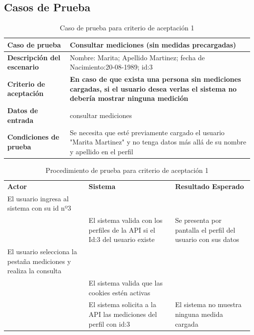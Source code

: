 \subsection{Casos de Prueba}


	{\scriptsize
	\begin{table}[h]
	\centering
	\begin{tabular}{||l|p{10cm}||}
    	\rowcolor[gray]{0.9}
	    \hline 
        \hline 
	    \textbf{Caso de prueba} & \textbf{Consultar mediciones (sin medidas precargadas)}\\  \hline
	    \textbf{Descripción del escenario}& Nombre: Marita; Apellido Martinez; fecha de Nacimiento:20-08-1989; id:3  \\ \hline
	    \textbf{Criterio de aceptación}&  \textbf{En caso de que exista una persona sin mediciones cargadas, si el usuario desea verlas el sistema no debería mostrar ninguna medición } \\ \hline
        \textbf{Datos de entrada}&  consultar mediciones\\ \hline
        \textbf{Condiciones de  prueba}& Se necesita que esté previamente cargado el usuario "Marita Martinez" y no tenga datos más allá de su nombre y apellido en el perfil \\ \hline \hline
	    \end{tabular}
        \caption{Caso de prueba para criterio de aceptación 1}
    	\end{table}
	}
  
{\scriptsize
	\begin{table}[h]
    \centering
	\begin{longtable}{|p{5cm}|p{5cm}|p{5cm}|}
	    \hline \hline \rowcolor[gray]{0.9}
        \multicolumn{3}{||l|}{\textbf{Procedimiento de Prueba - ``Consultar mediciones''}} \\
        \hline \rowcolor[gray]{0.9}
		    \textbf{Actor} & 
	        \textbf{Sistema}& 
        	\textbf{Resultado Esperado} \\  
        \hline
	    El usuario ingresa al sistema con su id nº3	& &\\ \hline
        		& El sistema valida con los perfiles de la API si el Id:3 del usuario existe& Se presenta por pantalla el perfil del usuario con sus datos  \\ \hline        
	    El usuario selecciona la pestaña mediciones y realiza la consulta& &\\ \hline
      	&El sistema valida que las cookies estén activas&\\ \hline
   		&El sistema solicita a la API las mediciones del perfil con id:3&El sistema no muestra ninguna medida cargada \\ \hline 
	    \end{longtable}
		\caption{Procedimiento de prueba para criterio de aceptación 1}
    	\end{table}
	}
    

